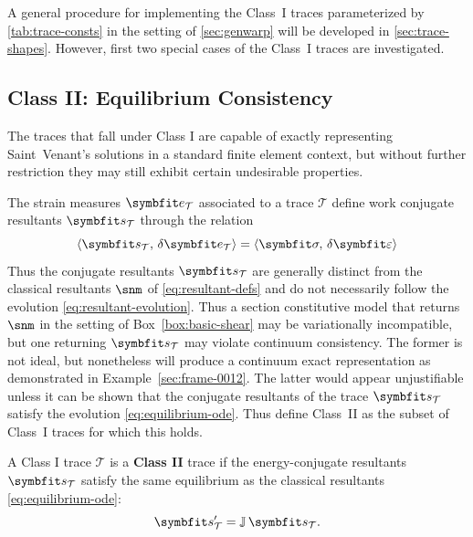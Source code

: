 A general procedure for implementing the Class~I traces parameterized by \cref{tab:trace-consts} in the setting of \cref{sec:genwarp} will be developed in \cref{sec:trace-shapes}. 
However, first two special cases of the Class~I traces are investigated.

\subsection{Class II: Equilibrium Consistency}\label{sec:class-ii}
The traces that fall under Class I are capable of exactly representing Saint~Venant's solutions in a standard finite element context, but without further restriction they may still exhibit certain undesirable properties.

The strain measures \(\TraceStrain\) associated to a trace \(\mathcal{T}\) define work conjugate resultants \(\TraceStress\) through the relation 
\[
\left<\TraceStress,\,\delta\TraceStrain\right> = \left<\StressVector,\,\delta\StrainVector\right>
\]
Thus the conjugate resultants \(\TraceStress\) are generally distinct from the classical resultants \(\snm\) of \eqref{eq:resultant-defs} and do not necessarily follow the evolution \eqref{eq:resultant-evolution}. 
Thus a section constitutive model that returns \(\snm\) in the setting of Box~\ref{box:basic-shear} may be variationally incompatible, but one returning \(\TraceStress\) may violate continuum consistency. 
The former is not ideal, but nonetheless will produce a continuum exact representation as demonstrated in Example~\ref{sec:frame-0012}. 
The latter would appear unjustifiable unless it can be shown that the conjugate resultants of the trace \(\TraceStress\) satisfy the evolution \eqref{eq:equilibrium-ode}. 
Thus define Class~II as the subset of Class~I traces for which this holds. 

\begin{definition}[Class II]\label{def:class-ii}
A Class I trace \(\mathcal{T}\) is a \textbf{Class II} trace if the energy-conjugate resultants $\TraceStress$ satisfy the same equilibrium as the classical resultants \eqref{eq:equilibrium-ode}:
\begin{equation}
\TraceStress' = \mathbb{J}\,\TraceStress.
\label{eq:sbar-equilibrium}
\end{equation}
\end{definition}

